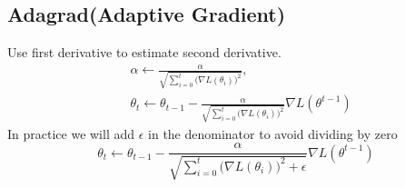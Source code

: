 \documentclass{article}
\begin{document}
        \subsection{Adagrad(Adaptive Gradient)}
            Use first derivative to estimate second derivative.
            \begin{align*}
                & \alpha\leftarrow\frac{\alpha}{\sqrt{\sum_{i=0}^t\big(\nabla L(\theta_i)\big)^2}}, \\
                & \theta_t \leftarrow \theta_{t-1} - \frac{\alpha}{\sqrt{\sum_{i=0}^t\big(\nabla L(\theta_i)\big)^2}}\nabla L(\theta^{t-1}) 
            \end{align*}
            In practice we will add $\epsilon$ in the denominator to avoid dividing by zero
            \[
                \theta_t \leftarrow \theta_{t-1} - \frac{\alpha}{\sqrt{ \sum_{i=0}^t \big( \nabla L(\theta_i) \big)^2 + \epsilon}}\nabla L(\theta^{t-1})        
            \]
\end{document}
